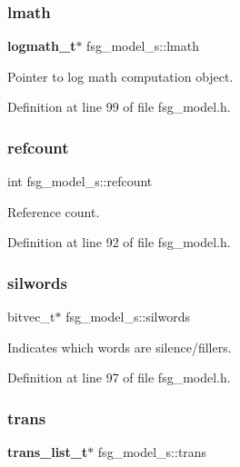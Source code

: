 \subsubsection{lmath}
{\footnotesize\ttfamily \textbf{ logmath\+\_\+t}$\ast$ fsg\+\_\+model\+\_\+s\+::lmath}



Pointer to log math computation object. 



Definition at line 99 of file fsg\+\_\+model.\+h.

\mbox{\label{structfsg__model__s_af329127556a42f6ea3b27f41a99a0b17}} 
\subsubsection{refcount}
{\footnotesize\ttfamily int fsg\+\_\+model\+\_\+s\+::refcount}



Reference count. 



Definition at line 92 of file fsg\+\_\+model.\+h.

\mbox{\label{structfsg__model__s_ab5709e67c1b7506ab024f2060d50331c}} 
\subsubsection{silwords}
{\footnotesize\ttfamily bitvec\+\_\+t$\ast$ fsg\+\_\+model\+\_\+s\+::silwords}



Indicates which words are silence/fillers. 



Definition at line 97 of file fsg\+\_\+model.\+h.

\mbox{\label{structfsg__model__s_ac5cd4b72818b7a9f2dc543d6a6ac9cc7}} 
\subsubsection{trans}
{\footnotesize\ttfamily \textbf{ trans\+\_\+list\+\_\+t}$\ast$ fsg\+\_\+model\+\_\+s\+::trans}



